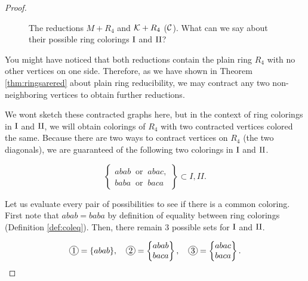 \begin{proof}
\begin{figure}[!ht]
    \caption{The reductions $M+R_4$ and $\mathcal{K}+R_4$ ($\mathcal{C}$). What can we say about their possible ring colorings $\text{I}$ and $\text{II}$?}
    \label{fig:ring4tut}
\end{figure}

You might have noticed that both reductions contain the plain ring $R_4$ with no other vertices on one side. Therefore, as we have shown in Theorem \ref{thm:ringsarered} about plain ring reducibility, we may contract any two non-neighboring vertices to obtain further reductions.

We wont sketch these contracted graphs here, but in the context of ring colorings in $\text{I}$ and $\text{II}$, we will obtain colorings of $R_4$ with two contracted vertices colored the same. Because there are two ways to contract vertices on $R_4$ (the two diagonals), we are guaranteed of the following two colorings in $\text{I}$ and $\text{II}$.

\begin{equation}
    \left\{\begin{matrix}
        abab \;\;\text{or}\;\; abac, \\
        baba \;\;\text{or}\;\; baca
    \end{matrix}\right\} \subset I,II.
\end{equation}

Let us evaluate every pair of possibilities to see if there is a common coloring. First note that $abab=baba$ by definition of equality between ring colorings (Definition \ref{def:coleq}). Then, there remain 3 possible sets for $\text{I}$ and $\text{II}$.

\needspace{2cm}
\begin{equation}
    \circled{1} = \{ abab \}, \quad \circled{2} = \left\{ \begin{matrix}abab \\ baca\end{matrix} \right\}, \quad \circled{3} = \left\{ \begin{matrix}abac \\ baca \end{matrix} \right\}.
\end{equation}


\end{proof}
